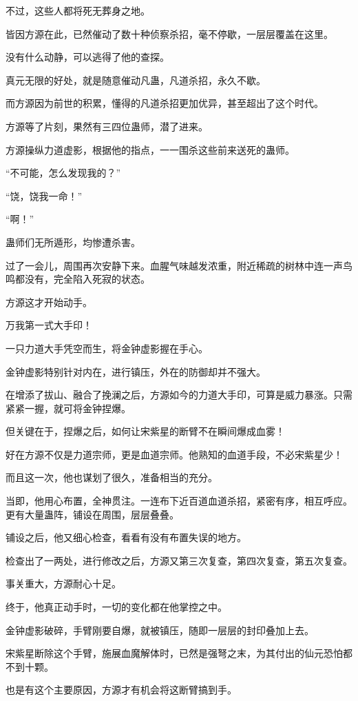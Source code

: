 \begin{this_body}
不过，这些人都将死无葬身之地。

皆因方源在此，已然催动了数十种侦察杀招，毫不停歇，一层层覆盖在这里。

没有什么动静，可以逃得了他的查探。

真元无限的好处，就是随意催动凡蛊，凡道杀招，永久不歇。

而方源因为前世的积累，懂得的凡道杀招更加优异，甚至超出了这个时代。

方源等了片刻，果然有三四位蛊师，潜了进来。

方源操纵力道虚影，根据他的指点，一一围杀这些前来送死的蛊师。

“不可能，怎么发现我的？”

“饶，饶我一命！”

“啊！”

蛊师们无所遁形，均惨遭杀害。

过了一会儿，周围再次安静下来。血腥气味越发浓重，附近稀疏的树林中连一声鸟鸣都没有，完全陷入死寂的状态。

方源这才开始动手。

万我第一式大手印！

一只力道大手凭空而生，将金钟虚影握在手心。

金钟虚影特别针对内在，进行镇压，外在的防御却并不强大。

在增添了拔山、融合了挽澜之后，方源如今的力道大手印，可算是威力暴涨。只需紧紧一握，就可将金钟捏爆。

但关键在于，捏爆之后，如何让宋紫星的断臂不在瞬间爆成血雾！

好在方源不仅是力道宗师，更是血道宗师。他熟知的血道手段，不必宋紫星少！

而且这一次，他也谋划了很久，准备相当的充分。

当即，他用心布置，全神贯注。一连布下近百道血道杀招，紧密有序，相互呼应。更有大量蛊阵，铺设在周围，层层叠叠。

铺设之后，他又细心检查，看看有没有布置失误的地方。

检查出了一两处，进行修改之后，方源又第三次复查，第四次复查，第五次复查。

事关重大，方源耐心十足。

终于，他真正动手时，一切的变化都在他掌控之中。

金钟虚影破碎，手臂刚要自爆，就被镇压，随即一层层的封印叠加上去。

宋紫星断除这个手臂，施展血魔解体时，已然是强弩之末，为其付出的仙元恐怕都不到十颗。

也是有这个主要原因，方源才有机会将这断臂搞到手。

\end{this_body}

